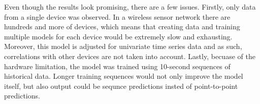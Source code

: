 Even though the results look promising, there are a few issues.
Firstly, only data from a single device was observed. 
In a wireless sensor network there are hundreds and more of devices, which means that creating data and training multiple models for each device would be extremely slow and exhausting.
Moreover, this model is adjusted for univariate time series data and as such, correlations with other devices are not taken into account. 
Lastly, becuase of the hardware limitation, the model was trained using 10-second sequences of historical data. 
Longer training sequences would not only improve the model itself, but also output could be sequnce predictions insted of point-to-point predictions.